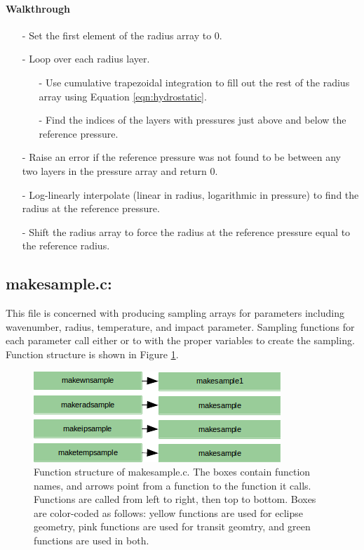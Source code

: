 \documentclass[letterpaper,12pt]{article}
\begin{document}
\paragraph{Walkthrough}
\begin{enumerate}[leftmargin=10pt, noitemsep, parsep=0pt, topsep=0ex]
\item[-] Set the first element of the radius array to 0.
\item[-] Loop over each radius layer.
\begin{enumerate}[leftmargin=10pt, noitemsep, parsep=0pt, topsep=0ex]
\item[-] Use cumulative trapezoidal integration to fill out the rest of the radius array using Equation \ref{eqn:hydrostatic}.
\item[-] Find the indices of the layers with pressures just above and below the reference pressure.
\end{enumerate}
\item[-] Raise an error if the reference pressure was not found to be between any two layers in the pressure array and return 0.
\item[-] Log-linearly interpolate (linear in radius, logarithmic in pressure) to find the radius at the reference pressure.
\item[-] Shift the radius array to force the radius at the reference pressure equal to the reference radius.
\end{enumerate}


\newpage
\subsection{makesample.c:}
This file is concerned with producing sampling arrays for parameters including wavenumber, radius, temperature, and impact parameter. Sampling functions for each parameter call either  or  to with the proper variables to create the sampling. Function structure is shown in Figure \ref{fig:makesamplec}.

\begin{figure}
\includegraphics{fig/makesamplec}
\caption{Function structure of makesample.c. The boxes contain function names, and arrows point from a function to the function it calls. Functions are called from left to right, then top to bottom.  Boxes are color-coded as follows:  yellow functions are used for eclipse geometry, pink functions are used for transit geomtry, and green functions are used in both.}
\label{fig:makesamplec}
\end{figure}
\end{document}
